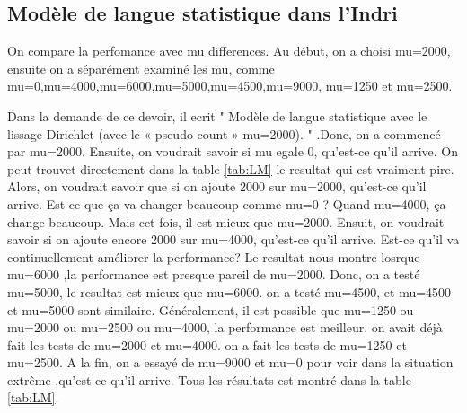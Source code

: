 \documentclass[a4paper]{article}
\begin{document}
\subsection{Modèle de langue statistique dans l'Indri}

On compare la perfomance avec mu differences. 
Au début, 
on a choisi mu=2000, 
ensuite on a séparément examiné les mu, 
comme mu=0,mu=4000,mu=6000,mu=5000,mu=4500,mu=9000, mu=1250 et mu=2500. 


Dans la demande de ce devoir, il ecrit " Modèle de langue statistique avec le lissage Dirichlet (avec le « pseudo-count » mu=2000). " .Donc, on a commencé par mu=2000. 
Ensuite, on voudrait savoir si mu egale 0, qu'est-ce qu'il arrive. On peut trouvet directement dans la table \ref{tab:LM} le resultat qui est vraiment pire. 
Alors, on voudrait savoir que si on ajoute 2000 sur mu=2000, qu'est-ce qu'il arrive. 
Est-ce que ça va changer beaucoup comme mu=0 ?
Quand mu=4000, ça change beaucoup. Mais cet fois, il est mieux que mu=2000.
Ensuit, on voudrait savoir si on ajoute encore 2000 sur mu=4000, qu'est-ce qu'il arrive. 
Est-ce qu'il va continuellement améliorer la performance? Le resultat nous montre losrque mu=6000 ,la performance est presque pareil de mu=2000. 
Donc, on a testé mu=5000, le resultat est mieux que mu=6000.
on a testé mu=4500, et mu=4500 et mu=5000 sont similaire.
Généralement, il est possible que mu=1250 ou mu=2000 ou mu=2500 ou mu=4000, la performance est meilleur. on avait déjà fait les tests de mu=2000 et mu=4000. on a fait les tests de mu=1250 et mu=2500.
A la fin, on a essayé de mu=9000  et mu=0 pour voir dans la situation extrême ,qu'est-ce qu'il arrive.
Tous les résultats est montré dans la table \ref{tab:LM}.
\end{document}
